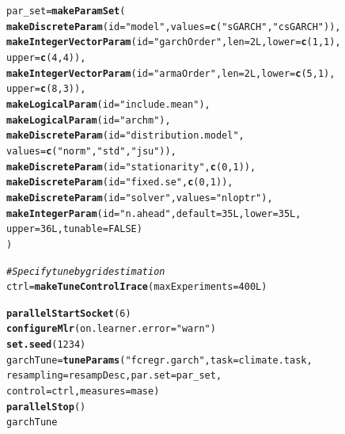 \documentclass{article}\usepackage[]{graphicx}\usepackage[]{color}
\makeatletter
\newcommand{\hlnum}[1]{\textcolor[rgb]{0.686,0.059,0.569}{#1}}%
\newcommand{\hlstr}[1]{\textcolor[rgb]{0.192,0.494,0.8}{#1}}%
\newcommand{\hlcom}[1]{\textcolor[rgb]{0.678,0.584,0.686}{\textit{#1}}}%
\newcommand{\hlstd}[1]{\textcolor[rgb]{0.345,0.345,0.345}{#1}}%
\newcommand{\hlkwb}[1]{\textcolor[rgb]{0.69,0.353,0.396}{#1}}%
\newcommand{\hlkwc}[1]{\textcolor[rgb]{0.333,0.667,0.333}{#1}}%
\newcommand{\hlkwd}[1]{\textcolor[rgb]{0.737,0.353,0.396}{\textbf{#1}}}%
\newenvironment{kframe}{%
 \def\at@end@of@kframe{}%
 \ifinner\ifhmode%
  \def\at@end@of@kframe{\end{minipage}}%
  \begin{minipage}{\columnwidth}%
 \fi\fi%
 \def\FrameCommand##1{\hskip\@totalleftmargin \hskip-\fboxsep
 \colorbox{shadecolor}{##1}\hskip-\fboxsep
     \hskip-\linewidth \hskip-\@totalleftmargin \hskip\columnwidth}%
 \MakeFramed {\advance\hsize-\width
   \@totalleftmargin\z@ \linewidth\hsize
   \@setminipage}}%
 {\par\unskip\endMakeFramed%
 \at@end@of@kframe}
\newenvironment{knitrout}{}{} %
\theoremstyle{definition}
\makeatother
\begin{document}
\begin{knitrout}
\color{fgcolor}\begin{kframe}
\begin{alltt}
\hlstd{par_set} \hlkwb{=} \hlkwd{makeParamSet}\hlstd{(}
  \hlkwd{makeDiscreteParam}\hlstd{(}\hlkwc{id} \hlstd{=} \hlstr{"model"}\hlstd{,} \hlkwc{values} \hlstd{=} \hlkwd{c}\hlstd{(}\hlstr{"sGARCH"}\hlstd{,} \hlstr{"csGARCH"}\hlstd{)),}
  \hlkwd{makeIntegerVectorParam}\hlstd{(}\hlkwc{id} \hlstd{=} \hlstr{"garchOrder"}\hlstd{,} \hlkwc{len} \hlstd{=} \hlnum{2L}\hlstd{,} \hlkwc{lower} \hlstd{=} \hlkwd{c}\hlstd{(}\hlnum{1}\hlstd{,}\hlnum{1}\hlstd{),}
                         \hlkwc{upper} \hlstd{=} \hlkwd{c}\hlstd{(}\hlnum{4}\hlstd{,}\hlnum{4}\hlstd{)),}
  \hlkwd{makeIntegerVectorParam}\hlstd{(}\hlkwc{id} \hlstd{=} \hlstr{"armaOrder"}\hlstd{,} \hlkwc{len} \hlstd{=} \hlnum{2L}\hlstd{,} \hlkwc{lower} \hlstd{=} \hlkwd{c}\hlstd{(}\hlnum{5}\hlstd{,}\hlnum{1}\hlstd{),}
                         \hlkwc{upper} \hlstd{=} \hlkwd{c}\hlstd{(}\hlnum{8}\hlstd{,}\hlnum{3}\hlstd{)),}
  \hlkwd{makeLogicalParam}\hlstd{(}\hlkwc{id} \hlstd{=} \hlstr{"include.mean"}\hlstd{),}
  \hlkwd{makeLogicalParam}\hlstd{(}\hlkwc{id} \hlstd{=} \hlstr{"archm"}\hlstd{),}
  \hlkwd{makeDiscreteParam}\hlstd{(}\hlkwc{id} \hlstd{=} \hlstr{"distribution.model"}\hlstd{,}
                    \hlkwc{values} \hlstd{=} \hlkwd{c}\hlstd{(}\hlstr{"norm"}\hlstd{,}\hlstr{"std"}\hlstd{,}\hlstr{"jsu"}\hlstd{)),}
  \hlkwd{makeDiscreteParam}\hlstd{(}\hlkwc{id} \hlstd{=} \hlstr{"stationarity"}\hlstd{,} \hlkwd{c}\hlstd{(}\hlnum{0}\hlstd{,}\hlnum{1}\hlstd{)),}
  \hlkwd{makeDiscreteParam}\hlstd{(}\hlkwc{id} \hlstd{=} \hlstr{"fixed.se"}\hlstd{,} \hlkwd{c}\hlstd{(}\hlnum{0}\hlstd{,}\hlnum{1}\hlstd{)),}
  \hlkwd{makeDiscreteParam}\hlstd{(}\hlkwc{id} \hlstd{=} \hlstr{"solver"}\hlstd{,} \hlkwc{values} \hlstd{=} \hlstr{"nloptr"}\hlstd{),}
  \hlkwd{makeIntegerParam}\hlstd{(}\hlkwc{id} \hlstd{=} \hlstr{"n.ahead"}\hlstd{,} \hlkwc{default} \hlstd{=} \hlnum{35L}\hlstd{,} \hlkwc{lower} \hlstd{=} \hlnum{35L}\hlstd{,}
                   \hlkwc{upper} \hlstd{=} \hlnum{36L}\hlstd{,} \hlkwc{tunable} \hlstd{=} \hlnum{FALSE}\hlstd{)}
\hlstd{)}

\hlcom{#Specify tune by grid estimation}
\hlstd{ctrl} \hlkwb{=} \hlkwd{makeTuneControlIrace}\hlstd{(}\hlkwc{maxExperiments} \hlstd{=} \hlnum{400L}\hlstd{)}

\hlkwd{parallelStartSocket}\hlstd{(}\hlnum{6}\hlstd{)}
\hlkwd{configureMlr}\hlstd{(}\hlkwc{on.learner.error} \hlstd{=} \hlstr{"warn"}\hlstd{)}
\hlkwd{set.seed}\hlstd{(}\hlnum{1234}\hlstd{)}
\hlstd{garchTune} \hlkwb{=} \hlkwd{tuneParams}\hlstd{(}\hlstr{"fcregr.garch"}\hlstd{,} \hlkwc{task} \hlstd{= climate.task,}
                       \hlkwc{resampling} \hlstd{= resampDesc,} \hlkwc{par.set} \hlstd{= par_set,}
                       \hlkwc{control} \hlstd{= ctrl,} \hlkwc{measures} \hlstd{= mase)}
\hlkwd{parallelStop}\hlstd{()}
\hlstd{garchTune}
\end{alltt}
\end{kframe}
\end{knitrout}
\end{document}
